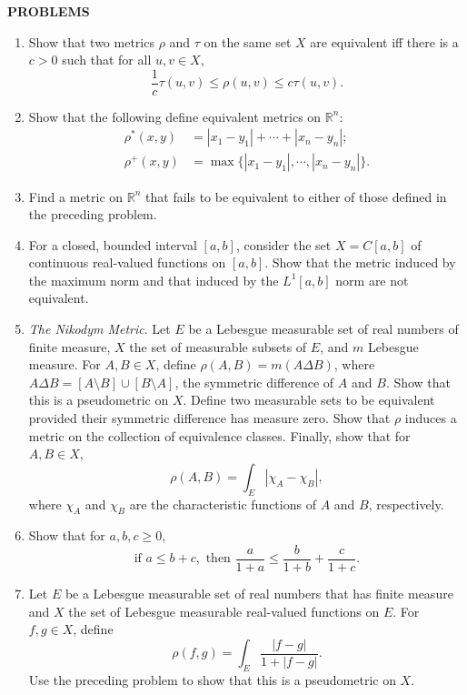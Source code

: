 \begin{center}
	\textbf{PROBLEMS}
\end{center}
\begin{enumerate}
	\setcounter{enumi}{0}
	\item Show that two metrics $\rho$ and $\tau$ on the same set $X$ are equivalent iff there is a $c>0$ such that for all $u,v\in X$,
	\[
        \frac{1}{c}\tau(u,v)\le\rho(u,v)\le c\tau(u,v).    
    \]
    \item Show that the following define equivalent metrics on $\mathbb{R}^n$:
    \begin{align*}
        \rho^*(x,y) &= |x_1-y_1| + \cdots + |x_n-y_n|;\\
        \rho^+(x,y) &= \max\{|x_1-y_1|, \cdots,|x_n-y_n|\}.
    \end{align*}
    \item Find a metric on $\mathbb{R}^n$ that fails to be equivalent to either of those defined in the preceding problem.
    \item For a closed, bounded interval $[a,b]$, consider the set $X=C[a,b]$ of continuous real-valued functions on $[a,b]$.
    Show that the metric induced by the maximum norm and that induced by the $L^1[a,b]$ norm are not equivalent.
    \item \textit{The Nikodym Metric}. Let $E$ be a Lebesgue measurable set of real numbers of finite measure, $X$ the set of measurable subsets of $E$, and $m$ Lebesgue measure.
    For $A,B\in X$, define $\rho(A,B)=m(A\Delta B)$, where $A\Delta B = [A\setminus B]\cup[B\setminus A]$, the symmetric difference of $A$ and $B$.
    Show that this is a pseudometric on $X$.
    Define two measurable sets to be equivalent provided their symmetric difference has measure zero.
    Show that $\rho$ induces a metric on the collection of equivalence classes.
    Finally, show that for $A,B\in X$, 
    \[
    \rho(A,B)=\int_E|\chi_A-\chi_B|,    
    \]
    where $\chi_A$ and $\chi_B$ are the characteristic functions of $A$ and $B$, respectively.
    \item Show that for $a,b,c\ge0$,
    \[
    \text{if }a\le b+c,\text{ then }\frac{a}{1+a}\le\frac{b}{1+b}+\frac{c}{1+c}.
    \]
    \item Let $E$ be a Lebesgue measurable set of real numbers that has finite measure and $X$ the set of Lebesgue measurable real-valued functions on $E$.
    For $f,g\in X$, define
    \[
    \rho(f,g)=\int_E\frac{|f-g|}{1+|f-g|}.    
    \]
    Use the preceding problem to show that this is a pseudometric on $X$. 

\end{enumerate}
